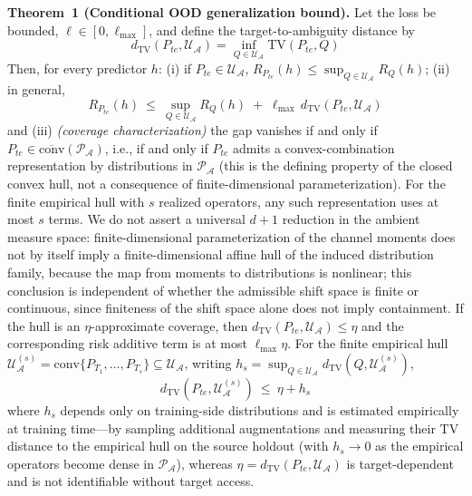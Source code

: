 \documentclass[electronics,article,submit,moreauthors]{Definitions/mdpi}
\begin{document}
\noindent\textbf{Theorem~1 (Conditional OOD generalization bound).} Let the loss be bounded, $\ell\in[0,\ell_{\max}]$, and define the target-to-ambiguity distance by
\begin{equation}
d_{\mathrm{TV}}(P_{te},\mathcal{U}_{\mathcal{A}})=\inf_{Q\in\mathcal{U}_{\mathcal{A}}}\mathrm{TV}(P_{te},Q)
\end{equation}
Then, for every predictor $h$:
(i) if $P_{te}\in\mathcal{U}_{\mathcal{A}}$, $R_{P_{te}}(h)\leq\sup_{Q\in\mathcal{U}_{\mathcal{A}}}R_Q(h)$;
(ii) in general,
\begin{equation}
R_{P_{te}}(h)\ \leq\ \sup_{Q\in\mathcal{U}_{\mathcal{A}}}R_Q(h)\;+\;\ell_{\max}\,d_{\mathrm{TV}}(P_{te},\mathcal{U}_{\mathcal{A}})
\end{equation}
and (iii) \emph{(coverage characterization)} the gap vanishes if and only if $P_{te}\in\overline{\mathrm{conv}}(\mathcal{P}_{\mathcal{A}})$, i.e., if and only if $P_{te}$ admits a convex-combination representation by distributions in $\mathcal{P}_{\mathcal{A}}$ (this is the defining property of the closed convex hull, not a consequence of finite-dimensional parameterization). For the finite empirical hull with $s$ realized operators, any such representation uses at most $s$ terms. We do not assert a universal $d+1$ reduction in the ambient measure space: finite-dimensional parameterization of the channel moments does not by itself imply a finite-dimensional affine hull of the induced distribution family, because the map from moments to distributions is nonlinear; this conclusion is independent of whether the admissible shift space is finite or continuous, since finiteness of the shift space alone does not imply containment. If the hull is an $\eta$-approximate coverage, then $d_{\mathrm{TV}}(P_{te},\mathcal{U}_{\mathcal{A}})\leq\eta$ and the corresponding risk additive term is at most $\ell_{\max}\eta$. For the finite empirical hull $\mathcal{U}_{\mathcal{A}}^{(s)}=\mathrm{conv}\{P_{T_1},\ldots,P_{T_s}\}\subseteq\mathcal{U}_{\mathcal{A}}$, writing $h_s=\sup_{Q\in\mathcal{U}_{\mathcal{A}}}d_{\mathrm{TV}}(Q,\mathcal{U}_{\mathcal{A}}^{(s)})$,
\begin{equation}
d_{\mathrm{TV}}(P_{te},\mathcal{U}_{\mathcal{A}}^{(s)})\ \leq\ \eta+h_s
\end{equation}
where $h_s$ depends only on training-side distributions and is estimated empirically at training time---by sampling additional augmentations and measuring their TV distance to the empirical hull on the source holdout (with $h_s\to0$ as the empirical operators become dense in $\mathcal{P}_{\mathcal{A}}$), whereas $\eta=d_{\mathrm{TV}}(P_{te},\mathcal{U}_{\mathcal{A}})$ is target-dependent and is not identifiable without target access.
\end{document}
